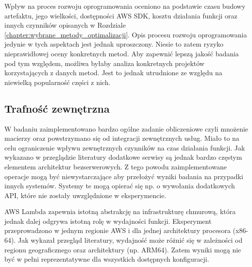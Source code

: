 Wpływ na proces rozwoju oprogramowania oceniono na podstawie czasu budowy artefaktu, jego wielkości, dostępności AWS SDK, kosztu działania funkcji oraz innych czynników opisanych w Rozdziale \ref{chapter:wybrane_metody_optimalizacji}.
Opis procesu rozwoju oprogramowania jedynie w tych aspektach jest jednak uproszczony.
Niesie to zatem ryzyko nieprawidłowej oceny konkretnych metod.
Aby zapewnić lepszą jakość badania pod tym względem, możliwa byłaby analiza konkretnych projektów korzystających z danych metod.
Jest to jednak utrudnione ze względu na niewielką popularność części z nich.

\subsection*{Trafność zewnętrzna}

W badaniu zaimplementowano bardzo ogólne zadanie obliczeniowe czyli mnożenie macierzy oraz powstrzymano się od integracji zewnętrznych usług.
Miało to na celu ograniczenie wpływu zewnętrznych czynników na czas działania funkcji.
Jak wykazano w przeglądzie literatury dodatkowe serwisy są jednak bardzo częstym elementem architektur bezserwerowych.
Z tego powodu zaimplementowane operacje mogą być niewystarczające aby przełożyć wyniki badania na przypadki innych systemów.
Systemy te mogą opierać się np. o wywołania dodatkowych API, które nie zostały uwzględnione w eksperymencie.

AWS Lambda zapewnia istotną abstrakcję na infrastrukturę chmurową, która jednak dalej odgrywa istotną rolę w wydajności funkcji.
Eksperyment przeprowadzono w jednym regionie AWS i dla jednej architektury procesora (x86-64). 
Jak wykazał przegląd literatury, wydajność może różnić się w zależności od regionu geograficznego oraz architektury (np. ARM64). 
Zatem wyniki mogą nie być w pełni reprezentatywne dla wszystkich dostępnych konfiguracji.
